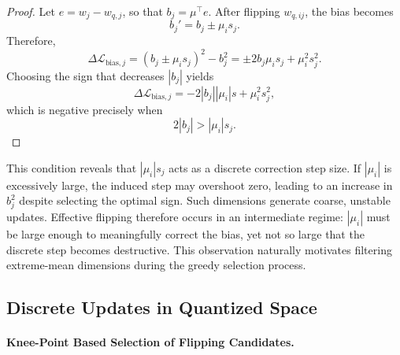 \documentclass[table, 11pt]{article}
\begin{document}
\begin{proof}
Let $e = w_j - w_{q,j}$, so that $b_j = \mu^\top e$.
After flipping $w_{q,ij}$, the bias becomes
\begin{equation}
b_j' = b_j \pm \mu_i s_j.
\end{equation}
Therefore,
\begin{equation}
\Delta \mathcal{L}_{\text{bias},j}
=
(b_j \pm \mu_i s_j)^2 - b_j^2
=
\pm 2 b_j \mu_i s_j + \mu_i^2 s_j^2.
\end{equation}
Choosing the sign that decreases $|b_j|$ yields
\begin{equation}
\Delta \mathcal{L}_{\text{bias},j}
=
- 2 |b_j| |\mu_i| s + \mu_i^2 s_j^2,
\end{equation}
which is negative precisely when
\begin{equation}
2 |b_j| > |\mu_i| s_j.
\end{equation}
\end{proof}
This condition reveals that $|\mu_i| s_j$ acts as a discrete correction step size.
If $|\mu_i|$ is excessively large, the induced step may overshoot zero,
leading to an increase in $b_j^2$ despite selecting the optimal sign.
Such dimensions generate coarse, unstable updates.
Effective flipping therefore occurs in an intermediate regime:
$|\mu_i|$ must be large enough to meaningfully correct the bias,
yet not so large that the discrete step becomes destructive.
This observation naturally motivates filtering extreme-mean
dimensions during the greedy selection process.

\subsection{Discrete Updates in Quantized Space}

\paragraph{Knee-Point Based Selection of Flipping Candidates.}
\end{document}
